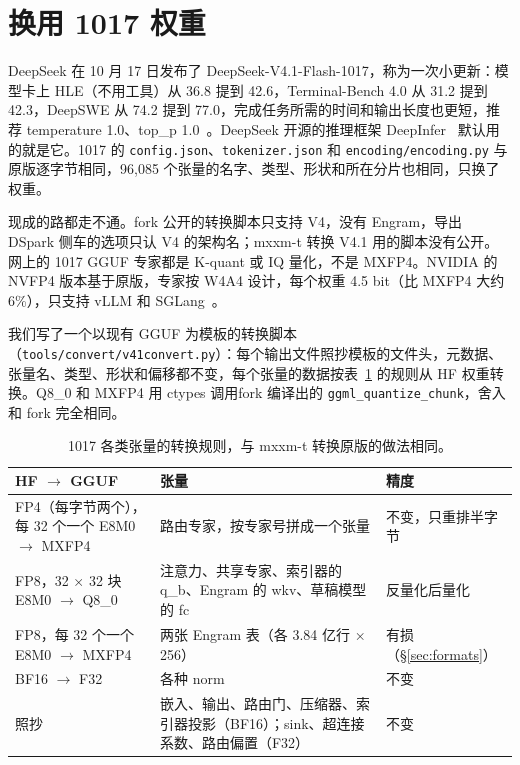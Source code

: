 \documentclass[11pt,a4paper]{article}
\newcommand{\code}[1]{\texttt{#1}}
\begin{document}
\section{换用 1017 权重}
\label{sec:w1017}

DeepSeek 在 10 月 17 日发布了 DeepSeek-V4.1-Flash-1017，称为一次小更新：模型卡上 HLE（不用工具）从 36.8 提到 42.6，Terminal-Bench 4.0 从 31.2 提到 42.3，DeepSWE 从 74.2 提到 77.0，完成任务所需的时间和输出长度也更短，推荐 temperature 1.0、top\_p 1.0~\cite{v411017}。DeepSeek 开源的推理框架 DeepInfer~\cite{deepinfer} 默认用的就是它。1017 的 \code{config.json}、\code{tokenizer.json} 和 \code{encoding/encoding.py} 与原版逐字节相同，96,085 个张量的名字、类型、形状和所在分片也相同，只换了权重。

现成的路都走不通。fork 公开的转换脚本只支持 V4，没有 Engram，导出 DSpark 侧车的选项只认 V4 的架构名；mxxm-t 转换 V4.1 用的脚本没有公开。网上的 1017 GGUF 专家都是 K-quant 或 IQ 量化，不是 MXFP4。NVIDIA 的 NVFP4 版本基于原版，专家按 W4A4 设计，每个权重 4.5 bit（比 MXFP4 大约 6\%），只支持 vLLM 和 SGLang~\cite{nvfp4}。

我们写了一个以现有 GGUF 为模板的转换脚本（\code{tools/convert/v41convert.py}）：每个输出文件照抄模板的文件头，元数据、张量名、类型、形状和偏移都不变，每个张量的数据按表~\ref{tab:convert} 的规则从 HF 权重转换。Q8\_0 和 MXFP4 用 ctypes 调用fork 编译出的 \code{ggml\_quantize\_chunk}，舍入和 fork 完全相同。

\begin{table}[h]
  \centering
  \small
  \caption{1017 各类张量的转换规则，与 mxxm-t 转换原版的做法相同。}
  \label{tab:convert}
  \begin{tabularx}{\textwidth}{@{}>{\raggedright\arraybackslash}p{4.4cm} X >{\raggedright\arraybackslash}p{3.0cm}@{}}
    \toprule
    HF $\to$ GGUF & 张量 & 精度 \\
    \midrule
    FP4（每字节两个），每 32 个一个 E8M0 $\to$ MXFP4 & 路由专家，按专家号拼成一个张量 & 不变，只重排半字节 \\
    FP8，32 × 32 块 E8M0 $\to$ Q8\_0 & 注意力、共享专家、索引器的 q\_b、Engram 的 wkv、草稿模型的 fc & 反量化后量化 \\
    FP8，每 32 个一个 E8M0 $\to$ MXFP4 & 两张 Engram 表（各 3.84 亿行 × 256） & 有损（\S\ref{sec:formats}） \\
    BF16 $\to$ F32 & 各种 norm & 不变 \\
    照抄 & 嵌入、输出、路由门、压缩器、索引器投影（BF16）；sink、超连接系数、路由偏置（F32） & 不变 \\
    \bottomrule
  \end{tabularx}
\end{table}
\end{document}
